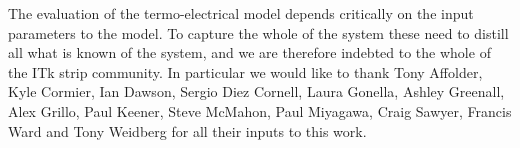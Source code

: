 The evaluation of the termo-electrical model depends critically on the input parameters to the model. To capture the whole of the system these need to distill all what is known of the system, and we are therefore indebted to the whole of the ITk strip community. In particular we would like to thank Tony Affolder, Kyle Cormier, Ian Dawson, Sergio Diez Cornell, Laura Gonella, Ashley Greenall, Alex Grillo, Paul Keener, Steve McMahon, Paul Miyagawa, Craig Sawyer, Francis Ward and Tony Weidberg for all their inputs to this work. 
